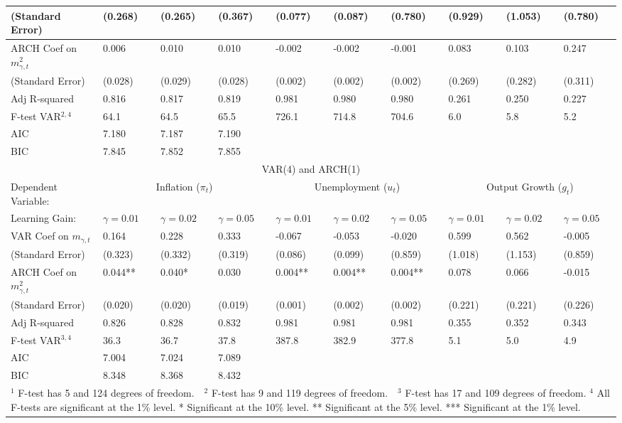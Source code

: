 \documentclass[12pt]{article}
\begin{document}
\begin{table}
\begin{small}
\begin{center}
\begin{tabular}{l|p{0.64in} p{0.64in} p{0.64in}|p{0.64in} p{0.64in} p{0.64in}|p{0.64in} p{0.64in} p{0.64in}}
(Standard Error) & (0.268) & (0.265) & (0.367) & (0.077) & (0.087) & (0.780) & (0.929) & (1.053) & (0.780) \\ \hline
ARCH Coef on $m_{\gamma,t}^2$ & 0.006 & 0.010 & 0.010 & -0.002 & -0.002 & -0.001 & 0.083 & 0.103 & 0.247 \\
(Standard Error) & (0.028) & (0.029) & (0.028) & (0.002) & (0.002) & (0.002) & (0.269) & (0.282) & (0.311) \\ \hline
Adj R-squared & 0.816 & 0.817 & 0.819 & 0.981 & 0.980 & 0.980 & 0.261 & 0.250 & 0.227 \\ 
F-test VAR$^{2,4}$ & 64.1 & 64.5 & 65.5 & 726.1 & 714.8 & 704.6 & 6.0 & 5.8 & 5.2 \\ 
AIC & 7.180 & 7.187 & 7.190   & & &   & & & \\ 
BIC & 7.845 & 7.852 & 7.855   & & &   & & & \\ \hline \hline
\multicolumn{10}{c}{VAR(4) and ARCH(1)} \\ \hline \hline
Dependent Variable:  & \multicolumn{3}{c|}{Inflation ($\pi_t$)} & \multicolumn{3}{c|}{Unemployment ($u_t$)} &  \multicolumn{3}{c}{Output Growth ($g_t$)} \\ \hline
Learning Gain: & $\gamma=0.01$ & $\gamma=0.02$ & $\gamma=0.05$ & $\gamma=0.01$ & $\gamma=0.02$ & $\gamma=0.05$& $\gamma=0.01$ & $\gamma=0.02$ & $\gamma=0.05$ \\ \hline
VAR Coef on $m_{\gamma,t}$ & 0.164 & 0.228 & 0.333 & -0.067 & -0.053 & -0.020 & 0.599 & 0.562 & -0.005 \\
(Standard Error) & (0.323) & (0.332) & (0.319) & (0.086) & (0.099) & (0.859) & (1.018) & (1.153) & (0.859) \\ \hline
ARCH Coef on $m_{\gamma,t}^2$ & 0.044** & 0.040* & 0.030 & 0.004** & 0.004** & 0.004** & 0.078 & 0.066 & -0.015 \\
(Standard Error) & (0.020) & (0.020) & (0.019) & (0.001) & (0.002) & (0.002) & (0.221) & (0.221) & (0.226) \\ \hline
Adj R-squared & 0.826 & 0.828 & 0.832 & 0.981 & 0.981 & 0.981 & 0.355 & 0.352 & 0.343 \\ 
F-test VAR$^{3,4}$ & 36.3 & 36.7 & 37.8 & 387.8 & 382.9 & 377.8 & 5.1 & 5.0 & 4.9 \\ 
AIC & 7.004 & 7.024 & 7.089   & & &   & & & \\ 
BIC & 8.348 & 8.368 & 8.432   & & &   & & & \\ \hline \hline
\multicolumn{10}{p{8.7in}}{$^1$ F-test has 5 and 124 degrees of freedom.~~$^2$ F-test has 9 and 119 degrees of freedom.~~$^3$ F-test has 17 and 109 degrees of freedom.\newline
$^4$ All F-tests are significant at the 1\% level. \newline
* Significant at the 10\% level.  ** Significant at the 5\% level.  *** Significant at the 1\% level.}\\
\end{tabular}
\end{center}
\end{small}
\end{table}
\end{document}
